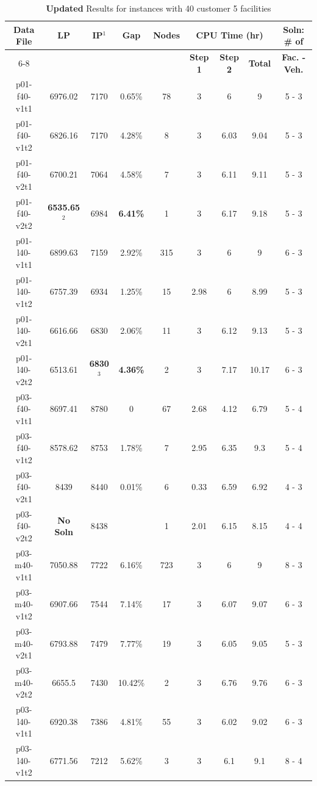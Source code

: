 \newpage
\begin{table}[h!tbp]
\centering
\caption{{\bf Updated} Results for instances with 40 customer 5 facilities}\label{40Cust_res2}
\begin {tabular}[t]{|c|c|c|c|c|c|c|c|c|}  
\hline
{\bf Data File} & {\bf LP} & {\bf IP$^1$} & {\bf Gap} & {\bf Nodes} & \multicolumn{3}{|c|}{\bf CPU Time (hr)} & {\bf Soln: \# of} \\\cline{6-8}  
\mbox{} & \mbox{} & \mbox{} & \mbox{} & \mbox{} &  {\bf Step 1 } & {\bf Step 2} & {\bf Total} & {\bf Fac. - Veh. } \\\hline
p01-f40-v1t1	&	6976.02	&	7170	&	0.65\%	&	78	&	3	&	6	&	9	&	5	-	3	\\
p01-f40-v1t2	&	6826.16	&	7170	&	4.28\%	&	8	&	3	&	6.03	&	9.04	&	5	-	3	\\
p01-f40-v2t1	&	6700.21	&	7064	&	4.58\%	&	7	&	3	&	6.11	&	9.11	&	5	-	3	\\
p01-f40-v2t2	&	{\bf 6535.65$^{2}$}	&	6984	&	{\bf 6.41\%}	&	1	&	3	&	6.17	&	9.18	&	5	-	3	\\
p01-l40-v1t1	&	6899.63	&	7159	&	2.92\%	&	315	&	3	&	6	&	9	&	6	-	3	\\
p01-l40-v1t2	&	6757.39	&	6934	&	1.25\%	&	15	&	2.98	&	6	&	8.99	&	5	-	3	\\
p01-l40-v2t1	&	6616.66	&	6830	&	2.06\%	&	11	&	3	&	6.12	&	9.13	&	5	-	3	\\
p01-l40-v2t2	&	6513.61	&	{\bf 6830$^{3}$}	&	{\bf 4.36\%}	&	2	&	3	&	7.17	&	10.17	&	6	-	3	\\
p03-f40-v1t1	&	8697.41	&	8780	&	0	&	67	&	2.68	&	4.12	&	6.79	&	5	-	4	\\
p03-f40-v1t2	&	8578.62	&	8753	&	1.78\%	&	7	&	2.95	&	6.35	&	9.3	&	5	-	4	\\
p03-f40-v2t1	&	8439	&	8440	&	0.01\%	&	6	&	0.33	&	6.59	&	6.92	&	4	-	3	\\
p03-f40-v2t2	&	{\bf No Soln}	&	8438	&	\mbox{}	&	1	&	2.01	&	6.15	&	8.15	&	4	-	4	\\
p03-m40-v1t1	&	7050.88	&	7722	&	6.16\%	&	723	&	3	&	6	&	9	&	8	-	3	\\
p03-m40-v1t2	&	6907.66	&	7544	&	7.14\%	&	17	&	3	&	6.07	&	9.07	&	6	-	3	\\
p03-m40-v2t1	&	6793.88	&	7479	&	7.77\%	&	19	&	3	&	6.05	&	9.05	&	5	-	3	\\
p03-m40-v2t2	&	6655.5	&	7430	&	10.42\%	&	2	&	3	&	6.76	&	9.76	&	6	-	3	\\
p03-l40-v1t1	&	6920.38	&	7386	&	4.81\%	&	55	&	3	&	6.02	&	9.02	&	6	-	3	\\
p03-l40-v1t2	&	6771.56	&	7212	&	5.62\%	&	3	&	3	&	6.1	&	9.1	&	8	-	4	\\

\end{tabular}
\end{table}
